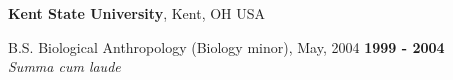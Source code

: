 \documentclass[margin,line,12pt]{res}
\newenvironment{list1}{
  \begin{list}{\ding{113}}{%
      \setlength{\itemsep}{0in}
      \setlength{\parsep}{0in} \setlength{\parskip}{0in}
      \setlength{\topsep}{0in} \setlength{\partopsep}{0in}
      \setlength{\leftmargin}{0.17in}}}{\end{list}}
\newenvironment{list2}{
  \begin{list}{$\bullet$}{%
      \setlength{\itemsep}{0in}
      \setlength{\parsep}{0in} \setlength{\parskip}{0in}
      \setlength{\topsep}{0in} \setlength{\partopsep}{0in}
      \setlength{\leftmargin}{0.2in}}}{\end{list}}
\begin{document}
\begin{resume}
{\bf Kent State University}, Kent, OH USA\\
\vspace*{-.1in}
\begin{list1}
\item[] B.S. Biological Anthropology (Biology minor),  May, 2004 \hfill {\bf 1999 - 2004} \\
\emph{Summa cum laude}
\end{list1}



%
%
%




\end{resume}
\end{document}

